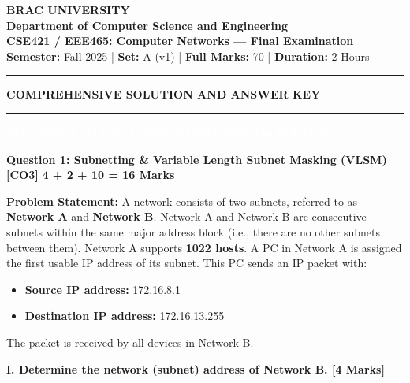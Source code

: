\documentclass[11pt,a4paper]{article}
\newcommand{\questionheader}[3]{
    \vspace{0.35cm}
    \noindent\colorbox{qboxbg}{
        \parbox{\dimexpr\textwidth-2\fboxsep\relax}{
            \textbf{\textcolor{primary}{\large #1}} \hfill \textbf{\textcolor{accent}{[#2]}} \hfill \textbf{\textcolor{secondary}{#3 Marks}}
        }
    }
    \vspace{0.15cm}
}
\newcommand{\sectionbanner}[1]{
    \vspace{0.5cm}
    \noindent\colorbox{primary}{
        \parbox{\dimexpr\textwidth-2\fboxsep\relax}{
            \centering \textbf{\textcolor{white}{\Large #1}}
        }
    }
    \vspace{0.25cm}
}
\begin{document}
\begin{center}
    {\LARGE \textbf{\textcolor{primary}{BRAC UNIVERSITY}}}\\[4pt]
    {\large \textbf{Department of Computer Science and Engineering}}\\[3pt]
    {\textbf{CSE421 / EEE465: Computer Networks --- Final Examination}}\\[2pt]
    \textbf{Semester:} Fall 2025 \quad | \quad \textbf{Set:} A (v1) \quad | \quad \textbf{Full Marks:} 70 \quad | \quad \textbf{Duration:} 2 Hours\\[2pt]
    \rule{\textwidth}{1.5pt}
    {\large \textbf{\textcolor{secondary}{COMPREHENSIVE SOLUTION AND ANSWER KEY}}}
    \rule{\textwidth}{0.8pt}
\end{center}

\sectionbanner{SECTION A: MANDATORY QUESTIONS (40 MARKS)}

\questionheader{Question 1: Subnetting \& Variable Length Subnet Masking (VLSM)}{CO3}{4 + 2 + 10 = 16}

\textbf{Problem Statement:}
A network consists of two subnets, referred to as \textbf{Network A} and \textbf{Network B}. Network A and Network B are consecutive subnets within the same major address block (i.e., there are no other subnets between them). Network A supports \textbf{1022 hosts}. A PC in Network A is assigned the first usable IP address of its subnet. This PC sends an IP packet with:
\begin{itemize}
    \item \textbf{Source IP address:} 172.16.8.1
    \item \textbf{Destination IP address:} 172.16.13.255
\end{itemize}
The packet is received by all devices in Network B.

\textbf{I. Determine the network (subnet) address of Network B. [4 Marks]}
\end{document}
